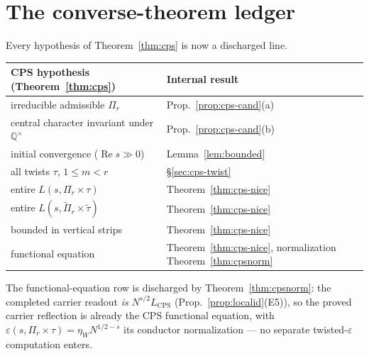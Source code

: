 \documentclass[11pt]{article}
\theoremstyle{definition}
\renewcommand{\Re}{\operatorname{Re}}
\begin{document}
\section{The converse-theorem ledger}\label{sec:cps-ledger}
Every hypothesis of Theorem~\ref{thm:cps} is now a discharged line.

\begin{center}
\begin{tabular}{ll}
\toprule
CPS hypothesis (Theorem~\ref{thm:cps}) & Internal result \\
\midrule
irreducible admissible $\Pi_r$ & Prop.~\ref{prop:cps-cand}(a) \\
central character invariant under $\mathbb Q^\times$ & Prop.~\ref{prop:cps-cand}(b) \\
initial convergence ($\Re s\gg0$) & Lemma~\ref{lem:bounded} \\
all twists $\tau$, $1\le m<r$ & \S\ref{sec:cps-twist} \\
entire $L(s,\Pi_r\times\tau)$ & Theorem~\ref{thm:cps-nice} \\
entire $L(s,\widetilde\Pi_r\times\widetilde\tau)$ & Theorem~\ref{thm:cps-nice} \\
bounded in vertical strips & Theorem~\ref{thm:cps-nice} \\
functional equation & Theorem~\ref{thm:cps-nice}, normalization Theorem~\ref{thm:cpsnorm} \\
\bottomrule
\end{tabular}
\end{center}

\noindent The functional-equation row is discharged by Theorem~\ref{thm:cpsnorm}: the completed carrier
readout \emph{is} $N^{s/2}L_{\mathrm{CPS}}$ (Prop.~\ref{prop:localid}(E5)), so the proved carrier reflection is
already the CPS functional equation, with $\varepsilon(s,\Pi_r\times\tau)=\eta_W N^{1/2-s}$ its conductor
normalization --- no separate twisted-$\varepsilon$ computation enters.
\end{document}
